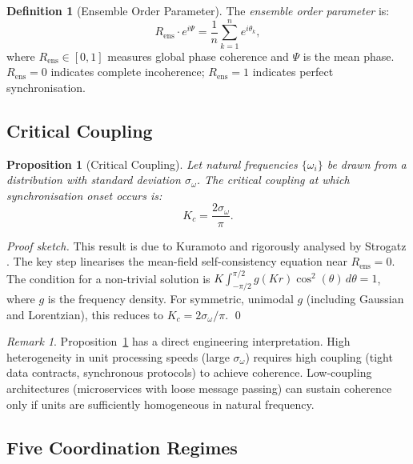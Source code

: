 \documentclass[twocolumn,a4paper,11pt]{article}
\theoremstyle{plain}
\newtheorem{proposition}[theorem]{Proposition}
\theoremstyle{definition}
\newtheorem{definition}[theorem]{Definition}
\theoremstyle{remark}
\newtheorem{remark}[theorem]{Remark}
\begin{document}
\begin{definition}[Ensemble Order Parameter]
\label{def:order-param}
The \emph{ensemble order parameter} is:
\[
  R_\mathrm{ens} \cdot e^{i\Psi} = \frac{1}{n} \sum_{k=1}^n
  e^{i\theta_k},
\]
where $R_\mathrm{ens} \in [0,1]$ measures global phase coherence and
$\Psi$ is the mean phase. $R_\mathrm{ens} = 0$ indicates complete
incoherence; $R_\mathrm{ens} = 1$ indicates perfect synchronisation.
\end{definition}

\subsection{Critical Coupling}

\begin{proposition}[Critical Coupling]
\label{prop:critical-coupling}
Let natural frequencies $\{\omega_i\}$ be drawn from a distribution with
standard deviation $\sigma_\omega$. The critical coupling at which
synchronisation onset occurs is:
\[
  K_c = \frac{2\sigma_\omega}{\pi}.
\]
\end{proposition}

\begin{proof}[Proof sketch]
This result is due to Kuramoto \cite{kuramoto1975} and rigorously analysed
by Strogatz \cite{strogatz2000}. The key step linearises the mean-field
self-consistency equation near $R_\mathrm{ens} = 0$. The condition for a
non-trivial solution is $K \int_{-\pi/2}^{\pi/2} g(K r)\cos^2(\theta)\,
d\theta = 1$, where $g$ is the frequency density. For symmetric, unimodal
$g$ (including Gaussian and Lorentzian), this reduces to
$K_c = 2\sigma_\omega / \pi$. \qed
\end{proof}

\begin{remark}
Proposition~\ref{prop:critical-coupling} has a direct engineering
interpretation. High heterogeneity in unit processing speeds (large
$\sigma_\omega$) requires high coupling (tight data contracts, synchronous
protocols) to achieve coherence. Low-coupling architectures (microservices
with loose message passing) can sustain coherence only if units are
sufficiently homogeneous in natural frequency.
\end{remark}

\subsection{Five Coordination Regimes}
\end{document}
